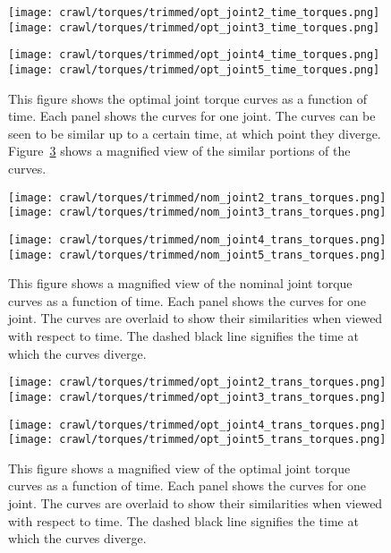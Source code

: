 \begin{figure}
\centering
\texttt{[image: crawl/torques/trimmed/opt\_joint2\_time\_torques.png]}
\texttt{[image: crawl/torques/trimmed/opt\_joint3\_time\_torques.png]}

\centering
\texttt{[image: crawl/torques/trimmed/opt\_joint4\_time\_torques.png]}
\texttt{[image: crawl/torques/trimmed/opt\_joint5\_time\_torques.png]}

\caption{This figure shows the optimal joint torque curves as a function of time.
         Each panel shows the curves for one joint. The curves can be seen to be similar
         up to a certain time, at which point they diverge.
         Figure~\ref{fig:vrep_opt_joint_transient_torques_by_joint1} shows a magnified
         view of the similar portions of the curves.}
\label{fig:vrep_opt_joint_torques_by_joint_over_time1}
\end{figure}

\begin{figure}
\centering
\texttt{[image: crawl/torques/trimmed/nom\_joint2\_trans\_torques.png]}
\texttt{[image: crawl/torques/trimmed/nom\_joint3\_trans\_torques.png]}

\centering
\texttt{[image: crawl/torques/trimmed/nom\_joint4\_trans\_torques.png]}
\texttt{[image: crawl/torques/trimmed/nom\_joint5\_trans\_torques.png]}

\caption{This figure shows a magnified view of the nominal joint torque curves as a function of time.
         Each panel shows the curves for one joint. The curves are overlaid to show their
         similarities when viewed with respect to time. The dashed black line signifies
         the time at which the curves diverge.}
\label{fig:vrep_nom_joint_transient_torques_by_joint1}
\end{figure}

\begin{figure}
\centering
\texttt{[image: crawl/torques/trimmed/opt\_joint2\_trans\_torques.png]}
\texttt{[image: crawl/torques/trimmed/opt\_joint3\_trans\_torques.png]}

\centering
\texttt{[image: crawl/torques/trimmed/opt\_joint4\_trans\_torques.png]}
\texttt{[image: crawl/torques/trimmed/opt\_joint5\_trans\_torques.png]}

\caption{This figure shows a magnified view of the optimal joint torque curves as a function of time.
         Each panel shows the curves for one joint. The curves are overlaid to show their
         similarities when viewed with respect to time. The dashed black line signifies
         the time at which the curves diverge.}
\label{fig:vrep_opt_joint_transient_torques_by_joint1}
\end{figure}

